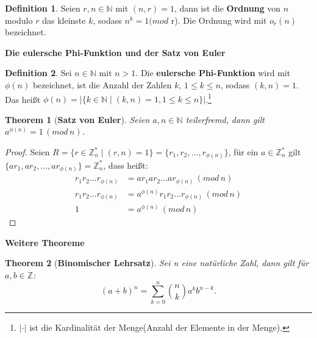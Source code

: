 \documentclass[12pt,oneside]{article}
\newtheorem{theorem}{Theorem}[section]
\theoremstyle{remark}
\theoremstyle{definition}
\newtheorem{definition}{Definition}[section]
\begin{document}
\smallskip

\begin{definition}\label{Df_4}
Seien $r,n \in \mathbb{N}$ mit $(n,r) = 1$, dann ist die \textbf{Ordnung} von $n$ modulo $r$ das kleinste $k$, sodass $n^k = 1 (mod $ r). Die Ordnung wird mit $o_{r}(n)$ bezeichnet.
\end{definition}

\smallskip 

\textbf{Die eulersche Phi-Funktion und der Satz von Euler}\newline
\begin{definition}\label{Df_6}
Sei $n \in \mathbb{N}$ mit $n > 1$. Die \textbf{eulersche Phi-Funktion} wird mit $\phi(n)$ bezeichnet, ist die Anzahl der Zahlen $k, \, 1 \leq k \leq n$, sodass $(k,n) = 1$. Das heißt $\phi(n) = |\{ k \in \mathbb{N} \mid (k,n) = 1, 1 \leq k \leq n \}|$.\footnote{$| \cdot |$ ist die Kardinalität der Menge(Anzahl der Elemente in der Menge).}
\end{definition}

\smallskip

\begin{theorem}[\textbf{Satz von Euler}]\label{Th_1}
Seien $a,n \in \mathbb{N}$ teilerfremd, \newline dann gilt $a^{\phi(n)} = 1 \, (mod \, n) $.
\end{theorem}

\begin{proof}
    
Seien $R =\{ r \in \mathbb{Z}_{n}^{*} \mid (r,n) = 1 \} =  \{r_{1}, r_{2},...,r_{\phi(n)} \}$, für ein $a \in \mathbb{Z}_{n}^{*}$ gilt $\{ar_{1},ar_{2},...,ar_{\phi(n)}\} = \mathbb{Z}_{n}^{*}$, dass heißt:\newline\newline
\begin{align*}
    r_{1}r_{2} \dots r_{\phi(n)} &= ar_{1}ar_{2} \dots ar_{\phi(n)} \, (mod \, n)\\
    r_{1}r_{2} \dots r_{\phi(n)} &= a^{\phi(n)} r_{1}r_{2} \dots r_{\phi(n)} \, (mod \, n) \\
    1 &= a^{\phi(n)} \, (mod \, n)
\end{align*}

\end{proof}

\smallskip

\textbf{Weitere Theoreme}\newline
\begin{theorem}[\textbf{Binomischer Lehrsatz}]\label{Th_3}
Sei n eine natürliche Zahl, dann gilt für $a,b \in \mathbb{Z}$:\newline\newline
 \begin{equation}
     (a + b)^n  = \sum_{k=0}^n {n \choose k} a^k b^{n-k}.
 \end{equation}
\end{theorem}
\end{document}
